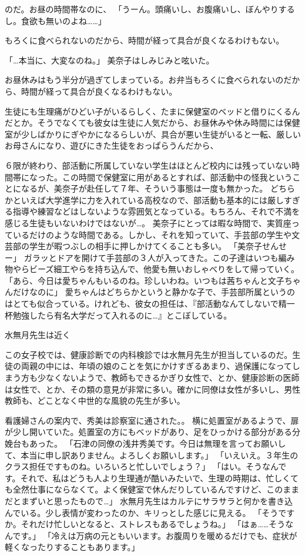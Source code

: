 のだ。お昼の時間帯なのに、
「うーん。頭痛いし、お腹痛いし、ぼんやりするし。食欲も無いのよね……」


もろくに食べられないのだから、時間が経って具合が良くなるわけもない。


「…本当に、大変なのね。」
美奈子はしみじみと呟いた。

お昼休みはもう半分が過ぎてしまっている。お弁当もろくに食べられないのだから、時間が経って具合が良くなるわけもない。

生徒にも生理痛がひどい子がいるらしく、たまに保健室のベッドと借りにくるんだとか。そうでなくても彼女は生徒に人気だから、お昼休みや休み時間には保健室が少しばかりにぎやかになるらしいが、具合が悪い生徒がいると一転、厳しいお母さんになり、遊びにきた生徒をおっぱらうんだから、

６限が終わり、部活動に所属していない学生はほとんど校内には残っていない時間帯になった。この時間で保健室に用があるとすれば、部活動中の怪我ということになるが、美奈子が赴任して７年、そういう事態は一度も無かった。
どちらかといえば大学進学に力を入れている高校なので、部活動も基本的には厳しすぎる指導や練習などはしないような雰囲気となっている。もちろん、それで不満を感じる生徒もいないわけではないが…。
美奈子にとっては暇な時間で、実質座っているだけのような時間である。しかし、それを知っていて、手芸部の学生や文芸部の学生が暇つぶしの相手に押しかけてくることも多い。
「美奈子せんせー」
ガラッとドアを開けて手芸部の３人が入ってきた。この子達はいつも編み物やらビーズ細工やらを持ち込んで、他愛も無いおしゃべりをして帰っていく。
「あら、今日は愛ちゃんもいるのね。珍しいわね。いつもは茜ちゃんと文子ちゃんだけなのに」
愛ちゃんはどちらかというと静かな子で、手芸部所属というのはとても似合っている。けれども、彼女の担任は、『部活動なんてしないで精一杯勉強したら有名大学だって入れるのに…』とこぼしている。


水無月先生は近く

この女子校では、健康診断での内科検診では水無月先生が担当しているのだ。生徒の両親の中には、年頃の娘のことを気にかけすぎるあまり、過保護になってしまう方も少なくないようで、教師もできるかぎり女性で、とか、健康診断の医師は女性で、とか、その類の意見が非常に多い。確かに同僚は女性が多いし、男性教師も、どことなく中世的な風貌の先生が多い。


看護婦さんの案内で、秀美は診察室に通された。。
横に処置室があるようで、扉が少し開いていた。処置室の方にもベッドがあり、足をひっかける部分がある分娩台もあった。
「石津の同僚の浅井秀美です。今日は無理を言ってお願いして、本当に申し訳ありません。よろしくお願いします。」
「いえいえ。３年生のクラス担任ですものね。いろいろと忙しいでしょう？」
「はい。そうなんです。それで、私はどうも人より生理通が酷いみたいで、生理の時期は、忙しくても全然仕事にならなくて。よく保健室で休んだりしているんですけど、このままだとまずいと思ったもので…」
水無月先生はカルテにサラサラと何かを書き込んでいる。少し表情が変わったのか、キリっとした感じに見える。
「そうですか。それだけ忙しいとなると、ストレスもあるでしょうね。」
「はぁ……そうなんです。」
「冷えは万病の元ともいいます。お腹周りを暖めるだけでも、症状が軽くなったりすることもあります。」



